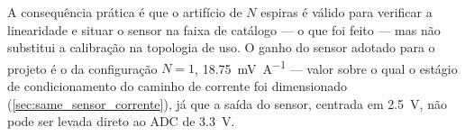A consequência prática é que o artifício de $N$ espiras é válido para verificar
a linearidade e situar o sensor na faixa de catálogo --- o que foi feito ---
mas não substitui a calibração na topologia de uso. O ganho do sensor adotado
para o projeto é o da configuração $N = 1$,
\SI{18,75}{\milli\volt\per\ampere} --- valor sobre o qual o estágio de
condicionamento do caminho de corrente foi dimensionado
(\autoref{sec:same_sensor_corrente}), já que a saída do sensor, centrada em
\SI{2,5}{\volt}, não pode ser levada direto ao ADC de \SI{3,3}{\volt}.
